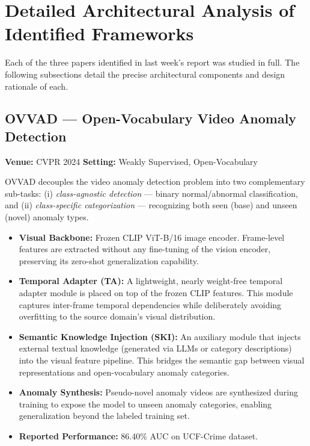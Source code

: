\documentclass[12pt, a4paper]{article}
\begin{document}
\section{Detailed Architectural Analysis of Identified Frameworks}

Each of the three papers identified in last week's report was studied in full. The following subsections detail the precise architectural components and design rationale of each.

\subsection{OVVAD --- Open-Vocabulary Video Anomaly Detection \cite{wu2024ovvad}}

\textbf{Venue:} CVPR 2024 \hfill \textbf{Setting:} Weakly Supervised, Open-Vocabulary

OVVAD decouples the video anomaly detection problem into two complementary sub-tasks: (i) \textit{class-agnostic detection} --- binary normal/abnormal classification, and (ii) \textit{class-specific categorization} --- recognizing both seen (base) and unseen (novel) anomaly types.

\begin{itemize}[leftmargin=*]
    \item \textbf{Visual Backbone:} Frozen CLIP ViT-B/16 image encoder. Frame-level features are extracted without any fine-tuning of the vision encoder, preserving its zero-shot generalization capability.
    
    \item \textbf{Temporal Adapter (TA):} A lightweight, nearly weight-free temporal adapter module is placed on top of the frozen CLIP features. This module captures inter-frame temporal dependencies while deliberately avoiding overfitting to the source domain's visual distribution.
    
    \item \textbf{Semantic Knowledge Injection (SKI):} An auxiliary module that injects external textual knowledge (generated via LLMs or category descriptions) into the visual feature pipeline. This bridges the semantic gap between visual representations and open-vocabulary anomaly categories.
    
    \item \textbf{Anomaly Synthesis:} Pseudo-novel anomaly videos are synthesized during training to expose the model to unseen anomaly categories, enabling generalization beyond the labeled training set.
    
    \item \textbf{Reported Performance:} 86.40\% AUC on UCF-Crime dataset.
\end{itemize}
\end{document}
